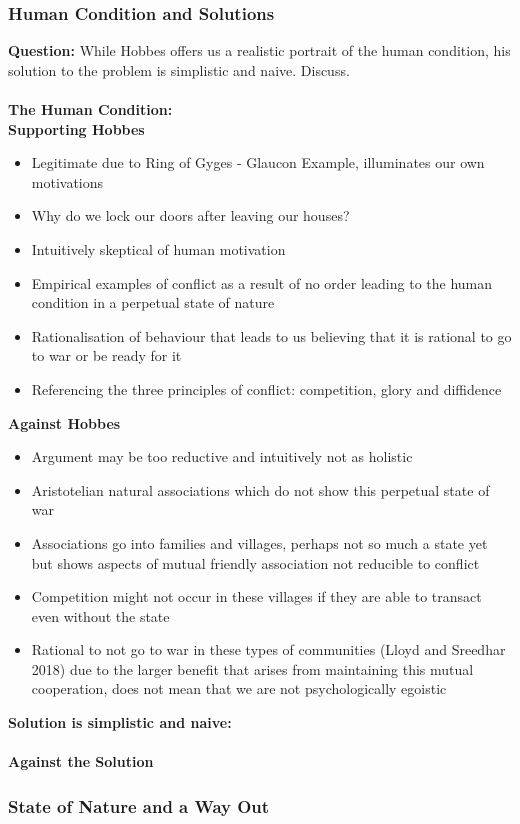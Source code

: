 \documentclass[12pt, letterpaper]{article}
\begin{document}
\subsubsection{Human Condition and Solutions}
\textbf{Question:} While Hobbes offers us a realistic portrait of the human condition, his solution to the problem is simplistic and naive. Discuss. \\\\
\textbf{The Human Condition:}\\
\textbf{Supporting Hobbes}
\begin{itemize}
	\item Legitimate due to Ring of Gyges - Glaucon Example, illuminates our own motivations
	\item Why do we lock our doors after leaving our houses?
	\item Intuitively skeptical of human motivation
	\item Empirical examples of conflict as a result of no order leading to the human condition in a perpetual state of nature
	\item Rationalisation of behaviour that leads to us believing that it is rational to go to war or be ready for it		
	\item Referencing the three principles of conflict: competition, glory and diffidence
\end{itemize}
\textbf{Against Hobbes}
\begin{itemize}
	\item Argument may be too reductive and intuitively not as holistic
	\item Aristotelian natural associations which do not show this perpetual state of war
	\item Associations go into families and villages, perhaps not so much a state yet but shows aspects of mutual friendly association not reducible to conflict
	\item Competition might not occur in these villages if they are able to transact even without the state
	\item Rational to not go to war in these types of communities (Lloyd and Sreedhar 2018) due to the larger benefit that arises from maintaining this mutual cooperation, does not mean that we are not psychologically egoistic
\end{itemize}
\textbf{Solution is simplistic and naive:}\\\\
\textbf{Against the Solution}


\subsubsection{State of Nature and a Way Out}
\end{document}

